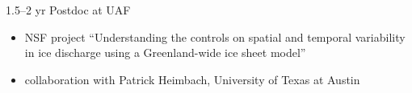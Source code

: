 \documentclass[hide notes,intlimits]{beamer}
\begin{document}
\begin{frame}[plain]
  \begin{figure}
\end{figure}
\end{frame}


\begin{frame}{1.5--2 yr Postdoc at UAF}
\begin{itemize}
\item NSF project ``Understanding the controls on spatial and temporal variability in ice discharge using a Greenland-wide ice sheet model''
\item collaboration with Patrick Heimbach, University of Texas at Austin
\end{itemize}
\end{frame}
\end{document}

